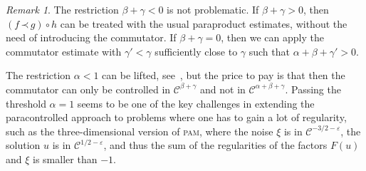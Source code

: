 \documentclass[a4paper,11pt]{article}
\newcommand{\mathD}{\mathrm{D}}
\theoremstyle{remark}
\newtheorem{remark}[theorem]{Remark}
\newcommand{\CC}{\ensuremath{\mathscr{C}}}
\newcommand{\lpara}{\,\mathord{\prec}\,}
\newcommand{\reso}{\,\mathord{\circ}\,}
\begin{document}
\begin{remark}
  The restriction $\beta + \gamma <0$ is not problematic. If $\beta + \gamma >0$, then $( f \lpara g ) \reso h$ can be treated with the usual paraproduct estimates, without the need of introducing the commutator. If $\beta + \gamma =0$, then we can apply the commutator estimate with $\gamma' < \gamma$
  sufficiently close to $\gamma$ such that $\alpha + \beta + \gamma' >0$.
  
  The restriction $\alpha < 1$ can be lifted, see~\cite{Gubinelli2015EBP}, but the price to pay is that then the commutator can only be controlled in $\CC^{\beta+\gamma}$ and not in $\CC^{\alpha+\beta+\gamma}$. Passing the threshold $\alpha = 1$ seems to be one of the key challenges in extending the paracontrolled approach to problems where one has to gain a lot of regularity, such as the three-dimensional version of \textsc{pam}, where the noise $\xi$ is in $\CC^{-3/2-\varepsilon}$, the solution $u$ is in $\CC^{1/2-\varepsilon}$, and thus the sum of the regularities of the factors $F(u)$ and $\xi$ is smaller than $-1$.
\end{remark}




\end{document}
